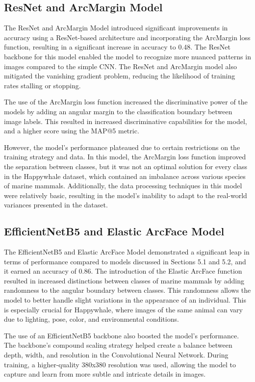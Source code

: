 \documentclass[twocolumn]{article}
\begin{document}
\subsection{ResNet and ArcMargin Model}

The ResNet and ArcMargin Model introduced significant improvements in accuracy using a ResNet-based architecture and incorporating the ArcMargin loss function, resulting in a significant increase in accuracy to 0.48. The ResNet backbone for this model enabled the model to recognize more nuanced patterns in images compared to the simple CNN. The ResNet and ArcMargin model also mitigated the vanishing gradient problem, reducing the likelihood of training rates stalling or stopping.

The use of the ArcMargin loss function increased the discriminative power of the models by adding an angular margin to the classification boundary between image labels. This resulted in increased discriminative capabilities for the model, and a higher score using the MAP@5 metric.

However, the model's performance plateaued due to certain restrictions on the training strategy and data. In this model, the ArcMargin loss function improved the separation between classes, but it was not an optimal solution for every class in the Happywhale dataset, which contained an imbalance across various species of marine mammals. Additionally, the data processing techniques in this model were relatively basic, resulting in the model's inability to adapt to the real-world variances presented in the dataset.

\subsection{EfficientNetB5 and Elastic ArcFace Model}

The EfficientNetB5 and Elastic ArcFace Model demonstrated a significant leap in terms of performance compared to models discussed in Sections 5.1 and 5.2, and it earned an accuracy of 0.86. The introduction of the Elastic ArcFace function resulted in increased distinctions between classes of marine mammals by adding randomness to the angular boundary between classes. This randomness allows the model to better handle slight variations in the appearance of an individual. This is especially crucial for Happywhale, where images of the same animal can vary due to lighting, pose, color, and environmental conditions. 

The use of an EfficientNetB5 backbone also boosted the model's performance. The backbone's compound scaling strategy helped create a balance between depth, width, and resolution in the Convolutional Neural Network. During training, a higher-quality 380x380 resolution was used, allowing the model to capture and learn from more subtle and intricate details in images.
\end{document}
